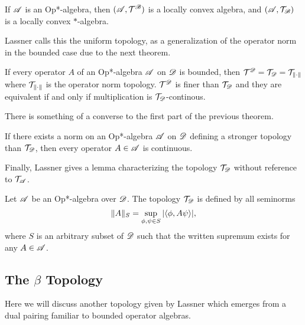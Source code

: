 \documentclass[../main.tex]{subfiles}
\begin{document}
\begin{theorem}

If $\mathscr{A}$ is an Op*-algebra, then $(\mathscr{A}, \mathcal{T}^\mathscr{B})$ is a locally convex algebra, and $(\mathscr{A}, \mathcal{T}_\mathscr{B})$ is a locally
convex $\ast$-algebra.

\end{theorem}

Lassner calls this the uniform topology, as a generalization of the operator norm in the bounded case due to the next theorem.

\begin{theorem}

	If every operator $A$ of an Op*-algebra $\mathscr{A}$ on $\mathscr{D}$ is bounded, then $\mathcal{T}^\mathscr{D} = \mathcal{T}_\mathscr{D} = \mathcal{T}_{\left\lVert\cdot\right\rVert}$
	where $\mathcal{T}_{\left\lVert\cdot\right\rVert}$ is the operator norm topology. $\mathcal{T}^\mathscr{D}$ is finer than $\mathcal{T}_\mathscr{D}$ and they are equivalent if and 
	only if multiplication is $\mathcal{T}_\mathscr{D}$-continous.

\end{theorem}


There is something of a converse to the first part of the previous theorem.

\begin{theorem}

If there exists a norm on an Op*-algebra $\mathscr{A}$ on $\mathscr{D}$ defining a stronger topology than $\mathcal{T}_\mathscr{D}$, then every operator $A \in \mathscr{A}$
is continuous.

\end{theorem}

Finally, Lassner gives a lemma characterizing the topology $\mathcal{T}_\mathscr{D}$ without reference to $\mathcal{T}_\mathscr{A}$.

\begin{lemma}

	Let $\mathscr{A}$ be an Op*-algebra over $\mathscr{D}$. The topology $\mathcal{T}_\mathscr{D}$ is defined by all seminorms 
	\[\|A\|_S = \sup_{\phi, \psi \in S}|\langle \phi, A\psi \rangle|,\] where $S$ is an arbitrary subset of $\mathscr{D}$ such that
	the written supremum exists for any $A \in \mathscr{A}$.


\end{lemma}


\subsection{The $\beta$ Topology}

Here we will discuss another topology given by Lassner which emerges from a dual pairing familiar to
bounded operator algebras.
\end{document}
